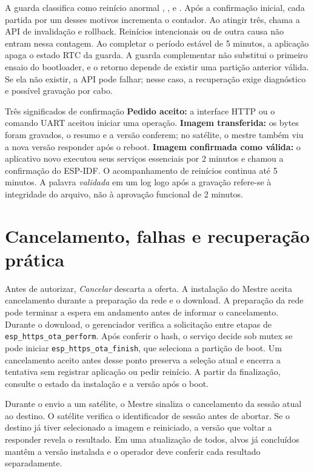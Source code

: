 A guarda classifica como reinício anormal , ,  e . Após a confirmação inicial, cada partida por um desses motivos incrementa o contador. Ao atingir três, chama a API de invalidação e rollback. Reinícios intencionais ou de outra causa não entram nessa contagem. Ao completar o período estável de 5 minutos, a aplicação apaga o estado RTC da guarda. A guarda complementar não substitui o primeiro ensaio do bootloader, e o retorno depende de existir uma partição anterior válida. Se ela não existir, a API pode falhar; nesse caso, a recuperação exige diagnóstico e possível gravação por cabo.

\begin{nota}{Três significados de confirmação}
\textbf{Pedido aceito:} a interface HTTP ou o comando UART aceitou iniciar uma operação. \textbf{Imagem transferida:} os bytes foram gravados, o resumo e a versão conferem; no satélite, o mestre também viu a nova versão responder após o reboot. \textbf{Imagem confirmada como válida:} o aplicativo novo executou seus serviços essenciais por 2 minutos e chamou a confirmação do ESP-IDF. O acompanhamento de reinícios continua até 5 minutos. A palavra \emph{validada} em um log logo após a gravação refere-se à integridade do arquivo, não à aprovação funcional de 2 minutos.
\end{nota}

\section{Cancelamento, falhas e recuperação prática}
Antes de autorizar, \emph{Cancelar} descarta a oferta. A instalação do Mestre aceita cancelamento durante a preparação da rede e o download. A preparação da rede pode terminar a espera em andamento antes de informar o cancelamento. Durante o download, o gerenciador verifica a solicitação entre etapas de \texttt{esp\_https\_ota\_perform}. Após conferir o hash, o serviço decide sob mutex se pode iniciar \texttt{esp\_https\_ota\_finish}, que seleciona a partição de boot. Um cancelamento aceito antes desse ponto preserva a seleção atual e encerra a tentativa sem registrar aplicação ou pedir reinício. A partir da finalização, consulte o estado da instalação e a versão após o boot.

Durante o envio a um satélite, o Mestre sinaliza o cancelamento da sessão atual ao destino. O satélite verifica o identificador de sessão antes de abortar. Se o destino já tiver selecionado a imagem e reiniciado, a versão que voltar a responder revela o resultado. Em uma atualização de todos, alvos já concluídos mantêm a versão instalada e o operador deve conferir cada resultado separadamente.

